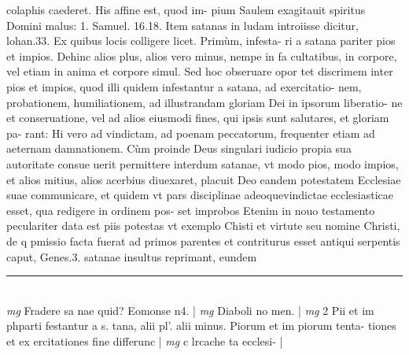 \documentclass{article}
\begin{document}
\begin{pages}
colaphis caederet. His affine est, quod im- pium Saulem exagitauit spiritus Domini malus: 1. Samuel. 16.18. Item satanas in ludam introiisse dicitur, lohan.33. Ex quibus locis colligere licet. Primùm, infesta- ri a satana pariter pios et impios. Dehinc alios plus, alios vero minus, nempe in fa cultatibus, in corpore, vel etiam in anima et corpore simul. Sed hoc obseruare opor tet discrimem inter pios et impios, quod illi quidem infestantur a satana, ad exercitatio- nem, probationem, humiliationem, ad illustrandam gloriam Dei in ipsorum liberatio- ne et conseruatione, vel ad alios eiusmodi fines, qui ipsis sunt salutares, et gloriam pa- rant: Hi vero ad vindictam, ad poenam peccatorum, frequenter etiam ad aeternam damnationem. Cùm proinde Deus singulari iudicio propia sua autoritate consue uerit permittere interdum satanae, vt modo pios, modo impios, et alios mitius, alios acerbius diuexaret, placuit Deo eandem potestatem Ecclesiae suae communicare, et quidem vt pars disciplinae adeoquevindictae ecclesiasticae esset, qua redigere in ordinem pos- set improbos Etenim in nouo testamento peculariter data est piis potestas vt exemplo Chisti et virtute seu nomine Christi, de q pmissio facta fuerat ad primos parentes et contriturus esset antiqui serpentis caput, Genes.3. satanae insultus reprimant, eundem  \pend
\vspace{0.5cm}\noindent
\vspace{0.2cm}\rule{1cm}{0.2pt}\\ 
\hspace{0.2cm}\textit{mg}
\footnotesize Fradere sa nae quid? Eomonse n4. 
\normalsize| 
\hspace{0.2cm}\textit{mg}
\footnotesize Diaboli no men. 
\normalsize| 
\hspace{0.2cm}\textit{mg}
\footnotesize 2 Pii et im phparti festantur a s. tana, alii pl'. alii minus. Piorum et im piorum tenta- tiones et ex ercitationes fine differunc 
\normalsize| 
\hspace{0.2cm}\textit{mg}
\footnotesize c lrcache ta ecclesi- 
\normalsize| 

\end{pages}
\end{document}
